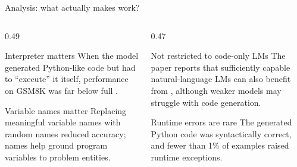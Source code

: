 \begin{frame}{Analysis: what actually makes \PAL{} work?}
\begin{columns}[T,totalwidth=\textwidth]
\begin{column}{0.49\textwidth}
\begin{block}{Interpreter matters}
When the model generated Python-like code but had to ``execute'' it itself, performance on GSM8K was far below full \PAL{}.
\end{block}
\begin{block}{Variable names matter}
Replacing meaningful variable names with random names reduced accuracy; names help ground program variables to problem entities.
\end{block}
\end{column}
\begin{column}{0.47\textwidth}
\begin{block}{Not restricted to code-only LMs}
The paper reports that sufficiently capable natural-language LMs can also benefit from \PAL{}, although weaker models may struggle with code generation.
\end{block}
\begin{block}{Runtime errors are rare}
The generated Python code was syntactically correct, and fewer than 1\% of examples raised runtime exceptions.
\end{block}
\end{column}
\end{columns}
\end{frame}
